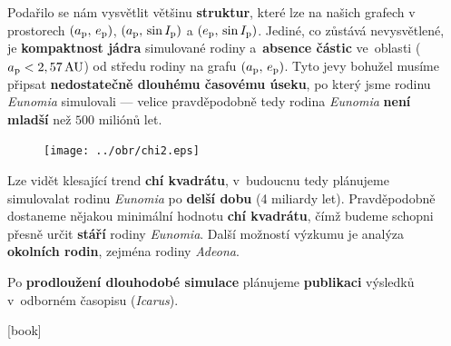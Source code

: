 \documentclass{beamer}
\newlength{\sep}
\newlength{\vyska}
\newlength{\vyskaC}
\newlength{\side}
\begin{document}
\begin{frame}
\begin{columns}[t]
\begin{column}{\side}
\begin{tcolorbox}[title=Závěry\phantom{Úy},height=0.38\vyskaC]
	Podařilo se nám vysvětlit většinu \textbf{struktur}, které lze na našich grafech v prostorech $(a_{\rm p},\,e_{\rm p})$, $(a_{\rm p},\,\sin I_{\rm p})$ a  $(e_{\rm p},\,\sin I_{\rm p})$. Jediné, co zůstává nevysvětlené, je \textbf{kompaktnost jádra} simulované rodiny a~\textbf{absence částic} ve~oblasti  ($a_{\rm p}<2,57\,{\rm AU}$) od středu rodiny na grafu $(a_{\rm p},\,e_{\rm p})$. Tyto jevy bohužel musíme připsat \textbf{nedostatečně dlouhému časovému úseku}, po který jsme rodinu \textit{Eunomia} simulovali --- velice pravděpodobně tedy rodina \textit{Eunomia} \textbf{není mladší} než $500$ miliónů let.
\end{tcolorbox}
\vspace{\sep}
\begin{tcolorbox}[title=Budoucí práce\phantom{Úy},height=0.3\vyskaC]
	\begin{figure}
		\centering
		\texttt{[image: ../obr/chi2.eps]}
	\end{figure}
	Lze vidět klesající trend \textbf{chí kvadrátu}, v~budoucnu tedy plánujeme simulovalat rodinu \textit{Eunomia} po \textbf{delší dobu} (4 miliardy let). Pravděpodobně dostaneme nějakou minimální hodnotu \textbf{chí kvadrátu}, čímž budeme schopni přesně určit \textbf{stáří} rodiny \textit{Eunomia}. Další možností výzkumu je analýza \textbf{okolních rodin}, zejména rodiny \textit{Adeona}. %

	Po \textbf{prodloužení dlouhodobé simulace} plánujeme \textbf{publikaci} výsledků v~odborném časopisu (\textit{Icarus}).

\end{tcolorbox}
\vspace{\sep}
\begin{tcolorbox}[title=Reference\phantom{Úy},height=0.32\vyskaC]
	\printbibliography

	\tcblower

	\newrefsection{}
	[book]
	\nocite{fmt}
	\nocite{murray00}
	\nocite{brozphd}
	\printbibliography
\end{tcolorbox}
\end{column}

\begin{column}{\sep}
\end{column}

\end{columns}
\end{frame}
\end{document}
